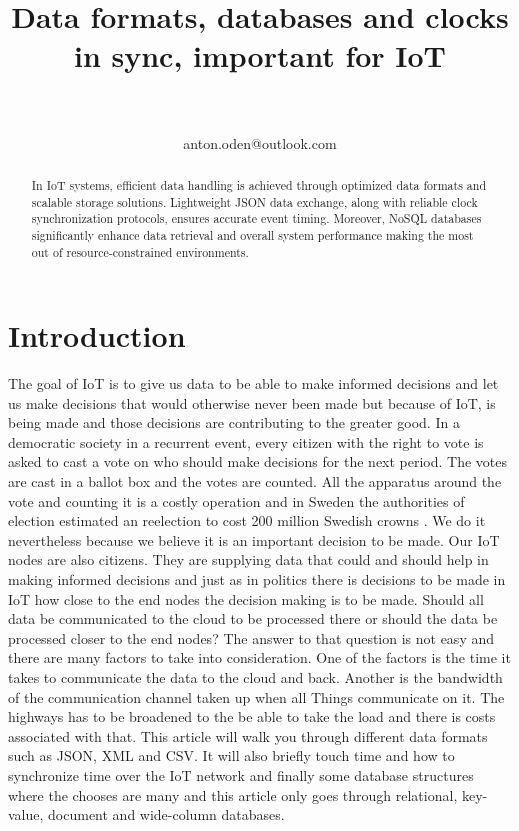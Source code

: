\documentclass[article,a4paper]{IEEEtran}
\title{Data formats, databases and clocks in sync, important for IoT}
\author{
\IEEEauthorblockN{Anton Odén}\\
\IEEEauthorblockA{Dept. of Maths and Computer Science\\Karlstad University\\
651 88 KARLSTAD, Sweden}\\
anton.oden@outlook.com
}
\begin{document}
\maketitle

\begin{abstract}
    In IoT systems, efficient data handling is achieved through optimized data formats and scalable storage solutions. Lightweight JSON data exchange, along with reliable clock synchronization protocols, ensures accurate event timing. Moreover, NoSQL databases significantly enhance data retrieval and overall system performance making the most out of resource-constrained environments.
\end{abstract}

\section{Introduction}
The goal of IoT is to give us data to be able to make informed decisions and let us make decisions that would otherwise never been made but because of IoT, is being made and those decisions are contributing to the greater good. In a democratic society in a recurrent event, every citizen with the right to vote is asked to cast a vote on who should make decisions for the next period. The votes are cast in a ballot box and the votes are counted. All the apparatus around the vote and counting it is a costly operation and in Sweden the authorities of election estimated an reelection to cost 200 million Swedish crowns \cite{CostElection}. We do it nevertheless because we believe it is an important decision to be made. Our IoT nodes are also citizens. They are supplying data that could and should help in making informed decisions and just as in politics there is decisions to be made in IoT how close to the end nodes the decision making is to be made. Should all data be communicated to the cloud to be processed there or should the data be processed closer to the end nodes? The answer to that question is not easy and there are many factors to take into consideration. One of the factors is the time it takes to communicate the data to the cloud and back. Another is the bandwidth of the communication channel taken up when all Things communicate on it. The highways has to be broadened to the be able to take the load and there is costs associated with that. 
\newline\newline
This article will walk you through different data formats such as JSON, XML and CSV. It will also briefly touch time and how to synchronize time over the IoT network and finally some database structures where the chooses are many and this article only goes through relational, key-value, document and wide-column databases.  
\end{document}
